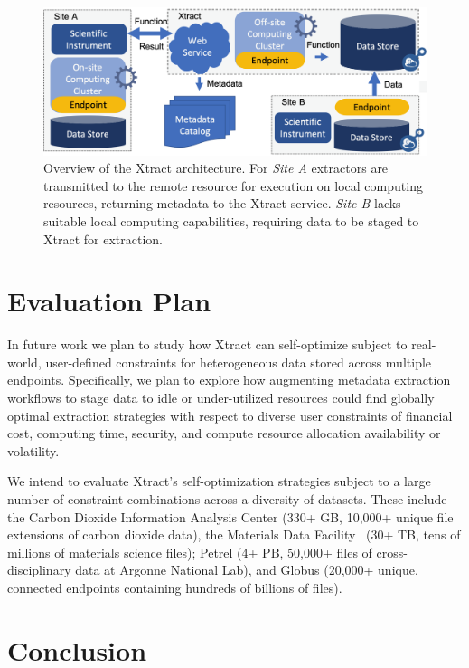 \documentclass[sigconf, 9pt]{acmart}
\newcommand{\name}{Xtract}
\begin{document}
\begin{figure}[t]
	\centering
	\includegraphics[scale=0.17]{figs/updated-fig.png}
	\caption{Overview of the \name{} architecture. For \textit{Site A} extractors are transmitted to the remote resource for execution on local computing resources, returning metadata to the \name{} service. 
    \textit{Site B} lacks suitable local computing capabilities, requiring data to be staged to \name{} for extraction.}
	\label{fig:arch}
\end{figure}


\section{Evaluation Plan}
\label{sec:eval}

In future work we plan to study how \name{} can self-optimize subject to real-world, user-defined constraints for heterogeneous data stored across multiple 
endpoints.  Specifically, we plan to explore how augmenting metadata extraction workflows to stage data to idle or under-utilized resources could 
find globally optimal extraction strategies with respect to diverse user constraints of financial cost, computing time, security, and compute resource allocation 
availability or volatility.

We intend to evaluate \name{}'s self-optimization strategies subject to a large number of constraint combinations across a diversity of datasets. 
These include the Carbon Dioxide Information Analysis Center (330+ GB, 10,000+ 
unique file extensions of carbon dioxide data), the Materials Data Facility~\cite{ blaiszik2019mdf} (30+ TB, tens of millions of materials science files); 
Petrel (4+ PB, 50,000+ files of cross-disciplinary data at Argonne National Lab), and Globus (20,000+ unique, connected 
endpoints containing hundreds of billions of files).


\section{Conclusion}
\label{sec:conc}
\end{document}
